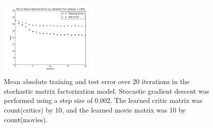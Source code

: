 \documentclass[10.5pt]{article}
\newcommand{\factwidth}{0.44}
\newcommand{\factheight}{1.6in}
\begin{document}
\begin{figure}[H]
\includegraphics[width=0\factwidth\textwidth,height=\factheight]{matrix_plots/test-i40d10l1000.png}
\caption{Mean absolute training and test error over 20 iterations in the stochastic matrix factorization model. Stocastic gradient descent was performed using a step size of 0.002. The learned critic matrix was count(critics) by 10, and the learned movie matrix was 10 by count(movies).}
\label{fig:fac-d10}
\end{figure}
\end{document}
